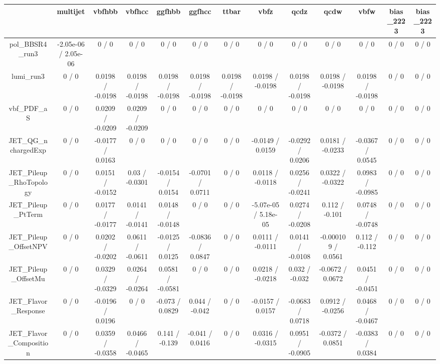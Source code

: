 \documentclass[10pt]{article}
\begin{document}
\begin{table}[htbp]
\begin{center}
\begin{tabular}{|c|c|c|c|c|c|c|c|c|c|c|c|c|}
\hline 
      & multijet      & vbfhbb      & vbfhcc      & ggfhbb      & ggfhcc      & ttbar      & vbfz      & qcdz      & qcdw      & vbfw      & bias_2223      & bias_2223 \\ 
\hline 
  pol_BBSR4_run3 & -2.05e-06 / 2.05e-06 & 0 / 0 & 0 / 0 & 0 / 0 & 0 / 0 & 0 / 0 & 0 / 0 & 0 / 0 & 0 / 0 & 0 / 0 & 0 / 0 & 0 / 0 \\ 
  lumi_run3 & 0 / 0 & 0.0198 / -0.0198 & 0.0198 / -0.0198 & 0.0198 / -0.0198 & 0.0198 / -0.0198 & 0.0198 / -0.0198 & 0.0198 / -0.0198 & 0.0198 / -0.0198 & 0.0198 / -0.0198 & 0.0198 / -0.0198 & 0 / 0 & 0 / 0 \\ 
  vbf_PDF_aS & 0 / 0 & 0.0209 / -0.0209 & 0.0209 / -0.0209 & 0 / 0 & 0 / 0 & 0 / 0 & 0 / 0 & 0 / 0 & 0 / 0 & 0 / 0 & 0 / 0 & 0 / 0 \\ 
  JET_QG_nchargedExp & 0 / 0 & -0.0177 / 0.0163 & 0 / 0 & 0 / 0 & 0 / 0 & 0 / 0 & -0.0149 / 0.0159 & -0.0292 / 0.0206 & 0.0181 / -0.0233 & -0.0367 / 0.0545 & 0 / 0 & 0 / 0 \\ 
  JET_Pileup_RhoTopology & 0 / 0 & 0.0151 / -0.0152 & 0.03 / -0.0301 & -0.0154 / 0.0154 & -0.0701 / 0.0711 & 0 / 0 & 0.0118 / -0.0118 & 0.0256 / -0.0241 & 0.0322 / -0.0322 & 0.0983 / -0.0985 & 0 / 0 & 0 / 0 \\ 
  JET_Pileup_PtTerm & 0 / 0 & 0.0177 / -0.0177 & 0.0141 / -0.0141 & 0.0148 / -0.0148 & 0 / 0 & 0 / 0 & -5.07e-05 / 5.18e-05 & 0.0274 / -0.0208 & 0.112 / -0.101 & 0.0748 / -0.0748 & 0 / 0 & 0 / 0 \\ 
  JET_Pileup_OffsetNPV & 0 / 0 & 0.0202 / -0.0202 & 0.0611 / -0.0611 & -0.0125 / 0.0125 & -0.0836 / 0.0847 & 0 / 0 & 0.0111 / -0.0111 & 0.0141 / -0.0108 & -0.000109 / 0.0561 & 0.112 / -0.112 & 0 / 0 & 0 / 0 \\ 
  JET_Pileup_OffsetMu & 0 / 0 & 0.0329 / -0.0329 & 0.0264 / -0.0264 & 0.0581 / -0.0581 & 0 / 0 & 0 / 0 & 0.0218 / -0.0218 & 0.032 / -0.032 & -0.0672 / 0.0672 & 0.0451 / -0.0451 & 0 / 0 & 0 / 0 \\ 
  JET_Flavor_Response & 0 / 0 & -0.0196 / 0.0196 & 0 / 0 & -0.073 / 0.0829 & 0.044 / -0.042 & 0 / 0 & -0.0157 / 0.0157 & -0.0683 / 0.0718 & 0.0912 / -0.0256 & 0.0468 / -0.0467 & 0 / 0 & 0 / 0 \\ 
  JET_Flavor_Composition & 0 / 0 & 0.0359 / -0.0358 & 0.0466 / -0.0465 & 0.141 / -0.139 & -0.041 / 0.0416 & 0 / 0 & 0.0316 / -0.0315 & 0.0951 / -0.0905 & -0.0372 / 0.0851 & -0.0383 / 0.0384 & 0 / 0 & 0 / 0 \\ 

\end{tabular}
\end{center}
\end{table}
\end{document}
